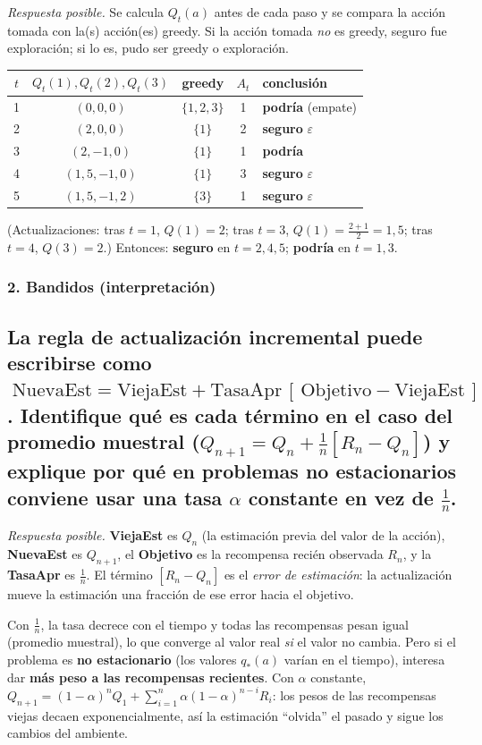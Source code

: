 \documentclass[11pt, a4paper]{article}
\newcommand{\pregunta}[1]{\subsection{#1}}
\newcommand{\eje}[1]{\subsubsection{#1}}
\begin{document}
\begin{respuesta}
\textit{Respuesta posible.} Se calcula $Q_t(a)$ antes de cada paso y se compara la acci\'on tomada con la(s) acci\'on(es) greedy. Si la acci\'on tomada \emph{no} es greedy, seguro fue exploraci\'on; si lo es, pudo ser greedy o exploraci\'on.

\begin{center}
\begin{tabular}{c c c c l}
\toprule
$t$ & $Q_t(1),Q_t(2),Q_t(3)$ & greedy & $A_t$ & conclusi\'on \\
\midrule
1 & $(0,0,0)$        & $\{1,2,3\}$ & 1 & \textbf{podr\'ia} (empate) \\
2 & $(2,0,0)$        & $\{1\}$     & 2 & \textbf{seguro} $\varepsilon$ \\
3 & $(2,-1,0)$       & $\{1\}$     & 1 & \textbf{podr\'ia} \\
4 & $(1{,}5,-1,0)$   & $\{1\}$     & 3 & \textbf{seguro} $\varepsilon$ \\
5 & $(1{,}5,-1,2)$   & $\{3\}$     & 1 & \textbf{seguro} $\varepsilon$ \\
\bottomrule
\end{tabular}
\end{center}

\noindent (Actualizaciones: tras $t{=}1$, $Q(1){=}2$; tras $t{=}3$, $Q(1){=}\frac{2+1}{2}{=}1{,}5$; tras $t{=}4$, $Q(3){=}2$.)
Entonces: \textbf{seguro} en $t=2,4,5$; \textbf{podr\'ia} en $t=1,3$.
\end{respuesta}

\eje{2. Bandidos (interpretaci\'on)}
\pregunta{La regla de actualizaci\'on incremental puede escribirse como
$\;\text{NuevaEst} = \text{ViejaEst} + \text{TasaApr}\,[\,\text{Objetivo} - \text{ViejaEst}\,]$.
Identifique qu\'e es cada t\'ermino en el caso del promedio muestral ($Q_{n+1}=Q_n+\frac{1}{n}[R_n-Q_n]$) y explique por qu\'e en problemas \textbf{no estacionarios} conviene usar una tasa $\alpha$ constante en vez de $\frac1n$.}

\begin{respuesta}
\textit{Respuesta posible.} \textbf{ViejaEst} es $Q_n$ (la estimaci\'on previa del valor de la acci\'on), \textbf{NuevaEst} es $Q_{n+1}$, el \textbf{Objetivo} es la recompensa reci\'en observada $R_n$, y la \textbf{TasaApr} es $\frac1n$. El t\'ermino $[R_n - Q_n]$ es el \emph{error de estimaci\'on}: la actualizaci\'on mueve la estimaci\'on una fracci\'on de ese error hacia el objetivo.

Con $\frac1n$, la tasa decrece con el tiempo y todas las recompensas pesan igual (promedio muestral), lo que converge al valor real \emph{si} el valor no cambia. Pero si el problema es \textbf{no estacionario} (los valores $q_*(a)$ var\'ian en el tiempo), interesa dar \textbf{m\'as peso a las recompensas recientes}. Con $\alpha$ constante, $Q_{n+1}=(1-\alpha)^n Q_1 + \sum_{i=1}^{n}\alpha(1-\alpha)^{n-i}R_i$: los pesos de las recompensas viejas decaen exponencialmente, as\'i la estimaci\'on ``olvida'' el pasado y sigue los cambios del ambiente.
\end{respuesta}
\end{document}
